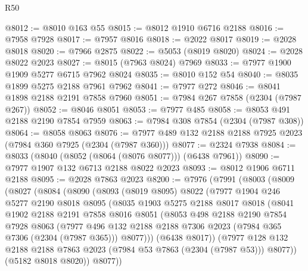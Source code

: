 \begin{lexlean}{R50}
\begin{coremodule}
@8012 := @8010 @163 @55
@8015 := @8012 @1910 @6716 @2188
@8016 := @7958 @7928
@8017 := @7957 @8016
@8018 := @2022 @8017
@8019 := @2028 @8018
@8020 := @7966 @2875
@8022 := @5053 (@8019 @8020)
@8024 := @2028 @8022 @2023
@8027 := @8015 (@7963 @8024) @7969
@8033 := @7977 @1900 @1909 @5277 @6715 @7962 @8024
@8035 := @8010 @152 @54
@8040 := @8035 @1899 @5275 @2188 @7961 @7962
@8041 := @7977 @272
@8046 := @8041 @1898 @2188 @2191 @7858 @7960
@8051 := @7984 @267 @7858 (@2304 (@7987 @267))
@8052 := @8046 @8051
@8053 := @7977 @485
@8058 := @8053 @491 @2188 @2190 @7854 @7959
@8063 := @7984 @308 @7854 (@2304 (@7987 @308))
@8064 := @8058 @8063
@8076 := @7977 @489 @132 @2188 @2188 @7925 @2023 (@7984 @360 @7925 (@2304 (@7987 @360)))
@8077 := @2324 @7938
@8084 := @8033 (@8040 (@8052 (@8064 (@8076 @8077))) (@6438 @7961))
@8090 := @7977 @1907 @132 @6713 @2188 @8022 @2023
@8093 := @8012 @1906 @6711 @2188
@8095 := @2028 @7863 @2023
@8200 := @7976
    (@7991
      (@8003
        (@8009
          (@8027
            (@8084
              (@8090
                (@8093
                  (@8019 @8095)
                  @8022
                  (@7977
                    @1904
                    @246
                    @5277
                    @2190
                    @8018
                    @8095
                    (@8035
                      @1903
                      @5275
                      @2188
                      @8017
                      @8018
                      (@8041
                        @1902
                        @2188
                        @2191
                        @7858
                        @8016
                        @8051
                        (@8053
                          @498
                          @2188
                          @2190
                          @7854
                          @7928
                          @8063
                          (@7977
                            @496
                            @132
                            @2188
                            @2188
                            @7306
                            @2023
                            (@7984 @365 @7306 (@2304 (@7987 @365)))
                            @8077)))
                      (@6438 @8017))
                    (@7977
                      @128
                      @132
                      @2188
                      @2188
                      @7863
                      @2023
                      (@7984 @53 @7863 (@2304 (@7987 @53)))
                      @8077))
                  (@5182 @8018 @8020))
                @8077))

\end{coremodule}
\end{lexlean}
